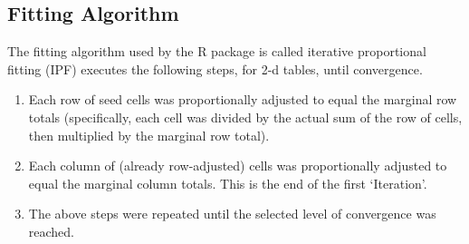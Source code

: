 \subsection{Fitting Algorithm}
The fitting algorithm used by the R package is called iterative proportional fitting (IPF) executes the following steps, for 2-d tables, until convergence.
\begin{enumerate}
    \item Each row of seed cells was proportionally adjusted to
    equal the marginal row totals (specifically, each cell was divided
    by the actual sum of the row of cells, then multiplied by the
    marginal row total).
    \item Each column of (already row-adjusted) cells was
    proportionally adjusted to equal the marginal column totals.
    This is the end of the first ‘Iteration’.
    \item The above steps were repeated until
    the selected level of convergence was reached.
\end{enumerate}
